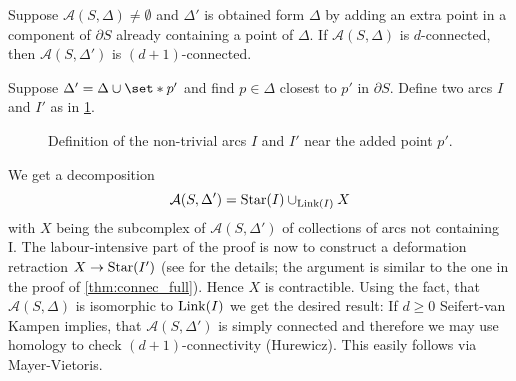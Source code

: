 \begin{lemma}[label=lem:d_dplus1]
	Suppose $\mathcal{A}(S,\Delta) \neq \emptyset$ and $\Delta'$ is obtained form $\Delta$ by adding an extra point in a component of $\partial S$ already containing a point of $\Delta$.
	If $\mathcal{A}(S,\Delta)$ is $d$-connected, then $\mathcal{A}(S,\Delta')$ is $(d+1)$-connected.
\end{lemma}
\begin{sketch}
	Suppose $\Delta' = \Delta \cup \set*{p'}$ and find $p \in \Delta$ closest to $p'$ in $\partial S$.
	Define two arcs $I$ and $I'$ as in \cref{fig:arcs_lemma_d_dplus1}.
	\begin{figure}[thb]
		\centering
		\caption{Definition of the non-trivial arcs $I$ and $I'$ near the added point $p'$.}\label{fig:arcs_lemma_d_dplus1}
	\end{figure}
	We get a decomposition
	\[
		\mathcal{A}(S,\Delta') = \operatorname{Star}(I) \cup_{\operatorname{Link}(I)} X
	\]
	with $X$ being the subcomplex of $\mathcal{A}(S,\Delta')$ of collections of arcs not containing I.
	The labour-intensive part of the proof is now to construct a deformation retraction $X \to \operatorname{Star}(I')$ (see \textcite{wahlHomological} for the details; the argument is similar to the one in the proof of \autoref{thm:connec_full}).
	Hence $X$ is contractible.
	Using the fact, that $\mathcal{A}(S,\Delta)$ is isomorphic to $\operatorname{Link}(I)$ we get the desired result: 
	If $d \ge 0$ Seifert-van Kampen implies, that $\mathcal{A}(S,\Delta')$ is simply connected and therefore we may use homology to check $(d+1)$-connectivity (Hurewicz).
	This easily follows via Mayer-Vietoris.
\end{sketch}

